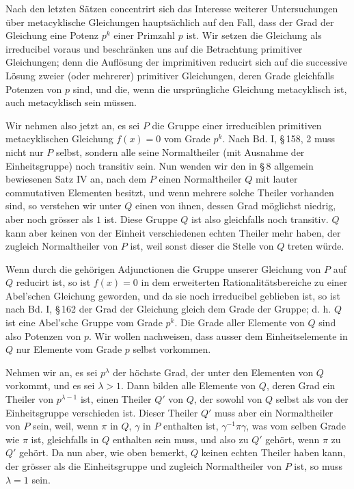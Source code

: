 \documentclass[11pt]{article}
\begin{document}
Nach den letzten Sätzen concentrirt sich das Interesse weiterer Untersuchungen über metacyklische Gleichungen hauptsächlich auf den Fall, dass der Grad der Gleichung eine Potenz $p^k$ einer Primzahl $p$ ist. Wir setzen die Gleichung als irreducibel voraus und beschränken uns auf die Betrachtung primitiver Gleichungen; denn die Auflösung der imprimitiven reducirt sich auf die successive Lösung zweier (oder mehrerer) primitiver Gleichungen, deren Grade gleichfalls Potenzen von $p$ sind, und die, wenn die ursprüngliche Gleichung metacyklisch ist, auch metacyklisch sein müssen.

Wir nehmen also jetzt an, es sei $P$ die Gruppe einer irreduciblen primitiven metacyklischen Gleichung $f(x)=0$ vom Grade $p^k$. Nach Bd. I, \S\,158, 2 muss nicht nur $P$ selbst, sondern alle seine Normaltheiler (mit Ausnahme der Einheitsgruppe) noch transitiv sein. Nun wenden wir den in \S\,8 allgemein bewiesenen Satz IV an, nach dem $P$ einen Normaltheiler $Q$ mit lauter commutativen Elementen besitzt, und wenn mehrere solche Theiler vorhanden sind, so verstehen wir unter $Q$ einen von ihnen, dessen Grad möglichst niedrig, aber noch grösser als $1$ ist. Diese Gruppe $Q$ ist also gleichfalls noch transitiv. $Q$ kann aber keinen von der Einheit verschiedenen echten Theiler mehr haben, der zugleich Normaltheiler von $P$ ist, weil sonst dieser die Stelle von $Q$ treten würde.

Wenn durch die gehörigen Adjunctionen die Gruppe unserer Gleichung von $P$ auf $Q$ reducirt ist, so ist $f(x)=0$ in dem erweiterten Rationalitätsbereiche zu einer Abel'schen Gleichung geworden, und da sie noch irreducibel geblieben ist, so ist nach Bd. I, \S\,162 der Grad der Gleichung gleich dem Grade der Gruppe; d. h. $Q$ ist eine Abel'sche Gruppe vom Grade $p^k$. Die Grade aller Elemente von $Q$ sind also Potenzen von $p$. Wir wollen nachweisen, dass ausser dem Einheitselemente in $Q$ nur Elemente vom Grade $p$ selbst vorkommen.

Nehmen wir an, es sei $p^\lambda$ der höchste Grad, der unter den Elementen von $Q$ vorkommt, und es sei $\lambda>1$. Dann bilden alle Elemente von $Q$, deren Grad ein Theiler von $p^{\lambda-1}$ ist, einen Theiler $Q'$ von $Q$, der sowohl von $Q$ selbst als von der Einheitsgruppe verschieden ist. Dieser Theiler $Q'$ muss aber ein Normaltheiler von $P$ sein, weil, wenn $\pi$ in $Q$, $\gamma$ in $P$ enthalten ist, $\gamma^{-1}\pi\gamma$, was vom selben Grade wie $\pi$ ist, gleichfalls in $Q$ enthalten sein muss, und also zu $Q'$ gehört, wenn $\pi$ zu $Q'$ gehört. Da nun aber, wie oben bemerkt, $Q$ keinen echten Theiler haben kann, der grösser als die Einheitsgruppe und zugleich Normaltheiler von $P$ ist, so muss $\lambda=1$ sein.
\end{document}
